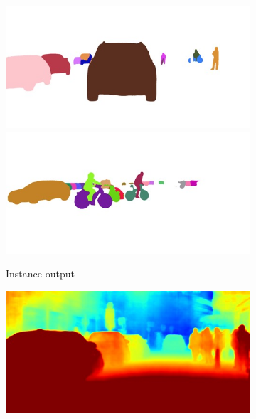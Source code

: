 \begin{figure}[t]
{\begin{subfigure}[t]{0.24\linewidth}
\begin{center}
		\includegraphics[width=\linewidth,trim={0px 60px 0 0px},clip]{qualitative/munich_000021_000019_instance_segmentation.jpg}
		\includegraphics[width=\linewidth,trim={0px 60px 0 0px},clip]{qualitative/munich_000042_000019_instance_segmentation.jpg}
  \caption{Instance output}
\end{center}
\end{subfigure}
\begin{subfigure}[t]{0.24\linewidth}
\begin{center}
		\includegraphics[width=\linewidth,trim={0px 60px 0 0px},clip]{qualitative/bielefeld_000000_026550_depth_prediction.jpg}

\end{center}
\end{subfigure}}
\end{figure}
